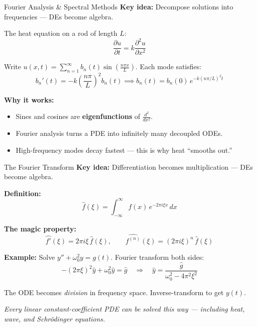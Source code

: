 
\begin{frame}{Fourier Analysis \& Spectral Methods}
\textbf{Key idea:} Decompose solutions into frequencies --- DEs become algebra.

\vspace{0.3cm}
The heat equation on a rod of length $L$:
\[
\frac{\partial u}{\partial t} = k \frac{\partial^2 u}{\partial x^2}
\]

Write $u(x,t) = \sum_{n=1}^{\infty} b_n(t) \sin\!\left(\frac{n\pi x}{L}\right)$. Each mode satisfies:
\[
b_n'(t) = -k\left(\frac{n\pi}{L}\right)^2 b_n(t) \implies b_n(t) = b_n(0)\, e^{-k(n\pi/L)^2 t}
\]

\vspace{0.2cm}
\textbf{Why it works:}
\begin{itemize}
    \item Sines and cosines are \textbf{eigenfunctions} of $\frac{d^2}{dx^2}$.
    \item Fourier analysis turns a PDE into infinitely many decoupled ODEs.
    \item High-frequency modes decay fastest --- this is why heat ``smooths out.''
\end{itemize}
\end{frame}


\begin{frame}{The Fourier Transform}
\textbf{Key idea:} Differentiation becomes multiplication --- DEs become algebra.

\vspace{0.2cm}
\textbf{Definition:}
\[
\hat{f}(\xi) = \int_{-\infty}^{\infty} f(x)\, e^{-2\pi i \xi x}\, dx
\]

\textbf{The magic property:}
\[
\widehat{f'}(\xi) = 2\pi i \xi\, \hat{f}(\xi), \qquad \widehat{f^{(n)}}(\xi) = (2\pi i \xi)^n\, \hat{f}(\xi)
\]

\vspace{0.2cm}
\textbf{Example:} Solve $y'' + \omega_0^2 y = g(t)$. Fourier transform both sides:
\[
-(2\pi\xi)^2 \hat{y} + \omega_0^2 \hat{y} = \hat{g} \quad \Longrightarrow \quad \hat{y} = \frac{\hat{g}}{\omega_0^2 - 4\pi^2\xi^2}
\]

The ODE becomes \emph{division} in frequency space. Inverse-transform to get $y(t)$.

\vspace{0.2cm}
\textit{Every linear constant-coefficient PDE can be solved this way --- including heat, wave, and Schr\"odinger equations.}
\end{frame}


